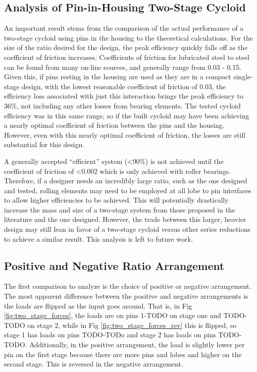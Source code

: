 \subsection{Analysis of Pin-in-Housing Two-Stage Cycloid} \label{ch:dual:discussion:actual}

An important result stems from the comparison of the actual performance of a two-stage cycloid using pins in the housing to the theoretical calculations. For the size of the ratio desired for the design, the peak efficiency quickly falls off as the coefficient of friction increases. Coefficients of friction for lubricated steel to steel can be found from many on-line sources, and generally range from 0.03 - 0.15. Given this, if pins resting in the housing are used as they are in a compact single-stage design, with the lowest reasonable coefficient of friction of 0.03, the efficiency loss associated with just this interaction brings the peak efficiency to 36\%, not including any other losses from bearing elements. The tested cycloid efficiency was in this same range, so if the built cycloid may have been achieving a nearly optimal coefficient of friction between the pins and the housing. However, even with this nearly optimal coefficient of friction, the losses are still substantial for this design. 


A generally accepted ``efficient'' system (\textless90\%) is not achieved until the coefficient of friction of \textless0.002 which is only achieved with roller bearings. Therefore, if a designer needs an incredibly large ratio, such as the one designed and tested, rolling elements may need to be employed at all lobe to pin interfaces to allow higher efficiencies to be achieved. This will potentially drastically increase the mass and size of a two-stage system from those proposed in the literature and the one designed. However, the trade between this larger, heavier design may still lean in favor of a two-stage cycloid versus other series reductions to achieve a similar result. This analysis is left to future work. 

\subsection{Positive and Negative Ratio Arrangement}\label{ch:dual:discussion:pos_neg}

The first comparison to analyze is the choice of positive or negative arrangement. The most apparent difference between the positive and negative arrangements is the loads are flipped as the input goes around. That is, in Fig \ref{fig:two_stage_forces}, the loads are on pins 1-TODO on stage one and TODO-TODO on stage 2, while in Fig \ref{fig:two_stage_forces_rev} this is flipped, so stage 1 has loads on pins TODO-TODo and stage 2 has loads on pins TODO-TODO. Additionally, in the positive arrangement, the load is slightly lower per pin on the first stage because there are more pins and lobes and higher on the second stage. This is reversed in the negative arrangement. 

